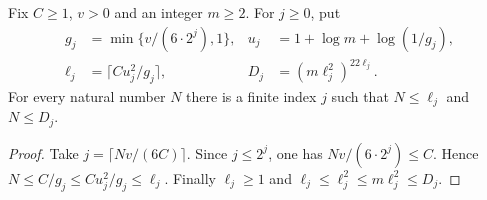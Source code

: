 \begin{theorem}
    \label{thm:dyadic_filter_count_finite_index}
    \leanok
    Fix $C\ge1$, $v>0$ and an integer $m\ge2$. For $j\ge0$, put
    \begin{align*}
        g_j    & =\min\{v/(6\cdot2^j),1\}, &
        u_j    & =1+\log m+\log(1/g_j),      \\
        \ell_j & =\lceil Cu_j^2/g_j\rceil, &
        D_j    & =(m\ell_j^2)^{22\ell_j}.
    \end{align*}
    For every natural number $N$ there is a finite index $j$ such that
    $N\le\ell_j$ and $N\le D_j$.
\end{theorem}
\begin{proof}
    \leanok
    Take $j=\lceil Nv/(6C)\rceil$. Since $j\le2^j$, one has
    $Nv/(6\cdot2^j)\le C$. Hence
    $N\le C/g_j\le Cu_j^2/g_j\le\ell_j$.
    Finally $\ell_j\ge1$ and
    $\ell_j\le\ell_j^2\le m\ell_j^2\le D_j$.
\end{proof}
